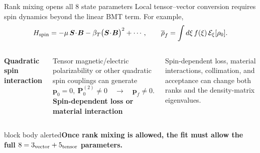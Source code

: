 \documentclass[aspectratio=169,11pt]{beamer}
\newcommand{\vct}[1]{\bm{#1}}
\newcommand{\Tens}{\bm P^{(2)}}
\newcommand{\conclusion}[1]{\begin{beamercolorbox}[rounded=true,sep=0.55em,wd=\textwidth]{block body alerted}\centering\bfseries\color{Navy}#1\end{beamercolorbox}}
\begin{document}
\begin{frame}{Rank mixing opens all 8 state parameters}
  Local tensor--vector conversion requires spin dynamics beyond the linear BMT term. For example,
  \[
    H_{\rm spin}
    =-\mu\,\vct S\!\cdot\!\vct B
     -\beta_T\bigl(\vct S\!\cdot\!\vct B\bigr)^2+\cdots,
    \qquad
    \overline\rho_f=\int d\xi\,f(\xi)\,\mathcal E_\xi[\rho_0].
  \]

  \begin{columns}[T,onlytextwidth]
      \textbf{Quadratic spin interaction}

      Tensor magnetic/electric polarizability or other quadratic spin couplings can generate
      \[
        \vct p_0=0,\ \Tens_0\neq0
        \quad\longrightarrow\quad
        \vct p_f\neq0.
      \]
      \textbf{Spin-dependent loss or material interaction}

      Spin-dependent loss, material interactions, collimation, and acceptance can change both ranks and the density-matrix eigenvalues.
  \end{columns}

  \vspace{0.35em}
  \conclusion{Once rank mixing is allowed, the fit must allow the full $8=3_{\rm vector}+5_{\rm tensor}$ parameters.}
\end{frame}
\end{document}
